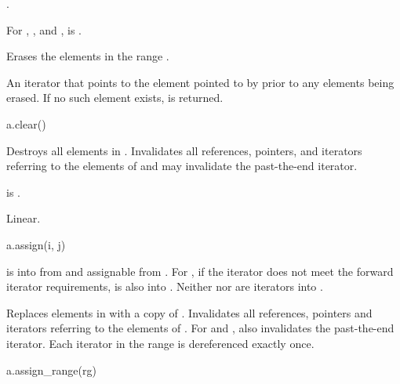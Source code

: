\begin{itemdescr}
\pnum
\result
{}.

\pnum
\expects
For , , and ,
 is .

\pnum
\effects
Erases the elements in the range \tcode{[q1, q2)}.

\pnum
\returns
An iterator that points to the element pointed to by 
prior to any elements being erased.
If no such element exists,  is returned.
\end{itemdescr}

%
\begin{itemdecl}
a.clear()
\end{itemdecl}

\begin{itemdescr}
\pnum
\result
{}

\pnum
\effects
Destroys all elements in .
Invalidates all references, pointers, and iterators
referring to the elements of  and
may invalidate the past-the-end iterator.

\pnum
\ensures
{} is .

\pnum
\complexity
Linear.
\end{itemdescr}

%
\begin{itemdecl}
a.assign(i, j)
\end{itemdecl}

\begin{itemdescr}
\pnum
\result
{}

\pnum
\expects
{} is  into  from 
and assignable from .
For ,
if the iterator does not meet
the forward iterator requirements,
 is also  into .
Neither  nor  are iterators into .

\pnum
\effects
Replaces elements in  with a copy of \tcode{[i, j)}.
Invalidates all references, pointers and iterators
referring to the elements of .
For  and ,
also invalidates the past-the-end iterator.
Each iterator in the range  is dereferenced exactly once.
\end{itemdescr}

%
\begin{itemdecl}
a.assign_range(rg)
\end{itemdecl}


